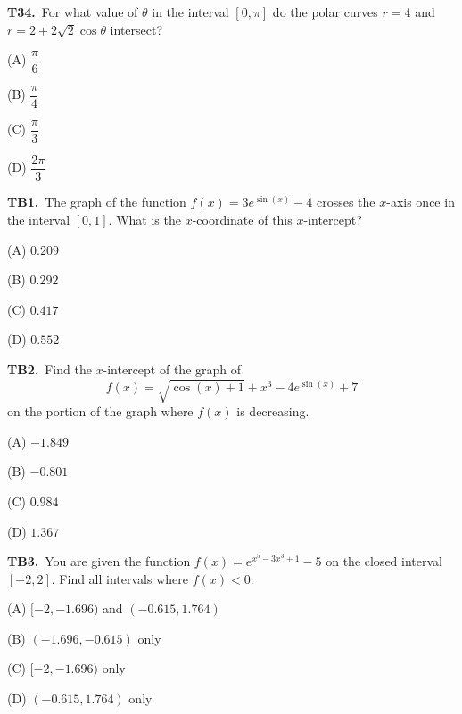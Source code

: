 \documentclass[11pt]{article}
\begin{document}
\bigskip\noindent\textbf{T34.}\ For what value of $\theta$ in the interval $[0,\pi]$ do the polar curves $r = 4$ and $r = 2 + 2\sqrt{2}\cos\theta$ intersect?
\begin{list}{}{\setlength{\leftmargin}{3em}\setlength{\labelwidth}{2.5em}\setlength{\itemsep}{0pt}\setlength{\topsep}{2pt}}
\item[(A)] $\dfrac{\pi}{6}$
\item[(B)] $\dfrac{\pi}{4}$
\item[(C)] $\dfrac{\pi}{3}$
\item[(D)] $\dfrac{2\pi}{3}$
\end{list}

\bigskip\noindent\textbf{TB1.}\ The graph of the function $f(x) = 3e^{\sin(x)} - 4$ crosses the $x$-axis once in the interval $[0,1]$. What is the $x$-coordinate of this $x$-intercept?
\begin{list}{}{\setlength{\leftmargin}{3em}\setlength{\labelwidth}{2.5em}\setlength{\itemsep}{0pt}\setlength{\topsep}{2pt}}
\item[(A)] $0.209$
\item[(B)] $0.292$
\item[(C)] $0.417$
\item[(D)] $0.552$
\end{list}

\bigskip\noindent\textbf{TB2.}\ Find the $x$-intercept of the graph of
\[ f(x) = \sqrt{\cos(x) + 1} + x^3 - 4e^{\sin(x)} + 7 \]
on the portion of the graph where $f(x)$ is decreasing.
\begin{list}{}{\setlength{\leftmargin}{3em}\setlength{\labelwidth}{2.5em}\setlength{\itemsep}{0pt}\setlength{\topsep}{2pt}}
\item[(A)] $-1.849$
\item[(B)] $-0.801$
\item[(C)] $0.984$
\item[(D)] $1.367$
\end{list}

\bigskip\noindent\textbf{TB3.}\ You are given the function $f(x) = e^{x^5 - 3x^3 + 1} - 5$ on the closed interval $[-2,2]$. Find all intervals where $f(x) < 0$.
\begin{list}{}{\setlength{\leftmargin}{3em}\setlength{\labelwidth}{2.5em}\setlength{\itemsep}{0pt}\setlength{\topsep}{2pt}}
\item[(A)] $[-2,-1.696)$ and $(-0.615,1.764)$
\item[(B)] $(-1.696,-0.615)$ only
\item[(C)] $[-2,-1.696)$ only
\item[(D)] $(-0.615,1.764)$ only
\end{list}
\end{document}
